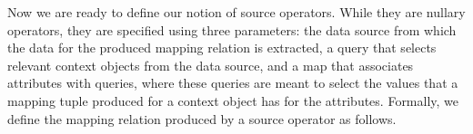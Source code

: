 \vspace{-1mm} %
\enlargethispage{\baselineskip}%




Now we are ready to define our notion of source operators. While they are nullary operators, they are specified using three parameters:
the data source from which the data for the produced mapping relation is extracted,
a query that selects relevant context objects from the data source,
and a map that associates attributes with
queries, where these queries are meant to select the values that a mapping tuple produced for a context object has for the attributes.
%
Formally, we define the mapping relation produced by a source operator as follows.

